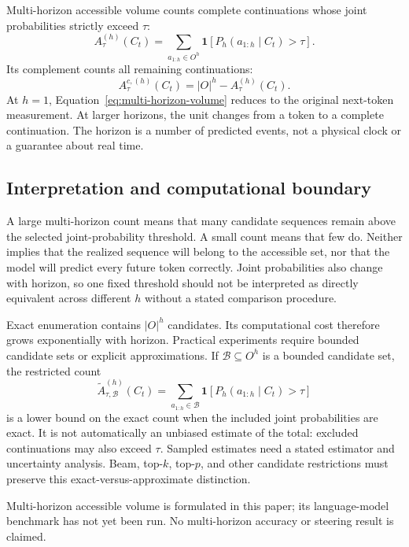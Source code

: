 \documentclass[11pt,a4paper]{article}
\begin{document}
Multi-horizon accessible volume counts complete continuations whose joint probabilities strictly exceed $\tau$:
\begin{equation}
A^{(h)}_\tau(C_t)=
\sum_{a_{1:h}\in O^h}
\mathbf{1}\!\left[P_h(a_{1:h}\mid C_t)>\tau\right].
\label{eq:multi-horizon-volume}
\end{equation}
Its complement counts all remaining continuations:
\begin{equation}
A^{c,(h)}_\tau(C_t)=|O|^h-A^{(h)}_\tau(C_t).
\label{eq:multi-horizon-complement}
\end{equation}
At $h=1$, Equation~\ref{eq:multi-horizon-volume} reduces to the original next-token measurement. At larger horizons, the unit changes from a token to a complete continuation. The horizon is a number of predicted events, not a physical clock or a guarantee about real time.

\subsection{Interpretation and computational boundary}
A large multi-horizon count means that many candidate sequences remain above the selected joint-probability threshold. A small count means that few do. Neither implies that the realized sequence will belong to the accessible set, nor that the model will predict every future token correctly. Joint probabilities also change with horizon, so one fixed threshold should not be interpreted as directly equivalent across different $h$ without a stated comparison procedure.

Exact enumeration contains $|O|^h$ candidates. Its computational cost therefore grows exponentially with horizon. Practical experiments require bounded candidate sets or explicit approximations. If $\mathcal{B}\subseteq O^h$ is a bounded candidate set, the restricted count
\begin{equation}
\widetilde A^{(h)}_{\tau,\mathcal{B}}(C_t)=
\sum_{a_{1:h}\in\mathcal{B}}
\mathbf{1}\!\left[P_h(a_{1:h}\mid C_t)>\tau\right]
\end{equation}
is a lower bound on the exact count when the included joint probabilities are exact. It is not automatically an unbiased estimate of the total: excluded continuations may also exceed $\tau$. Sampled estimates need a stated estimator and uncertainty analysis. Beam, top-$k$, top-$p$, and other candidate restrictions must preserve this exact-versus-approximate distinction.

Multi-horizon accessible volume is formulated in this paper; its language-model benchmark has not yet been run. No multi-horizon accuracy or steering result is claimed.
\end{document}
